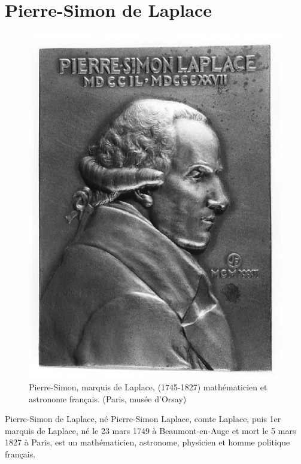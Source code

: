 \chapter{Pierre-Simon de Laplace\label{annexe-lap_irl}}
\begin{figure}[!b]
    \centering
    \includegraphics[width=0.5\linewidth]{fig/Pierre-Simon-Laplace_2}
    \caption*{Pierre-Simon, marquis de Laplace,  (1745-1827) mathématicien 
             et astronome français. (Paris, musée d'Orsay)}
\end{figure}
\indent Pierre-Simon de Laplace, né Pierre-Simon Laplace, comte Laplace, puis 
1er marquis de Laplace, né le 23 mars 1749 à Beaumont-en-Auge et mort le 5 
mars 1827 à Paris, est un mathématicien, astronome, physicien et homme 
politique français.

